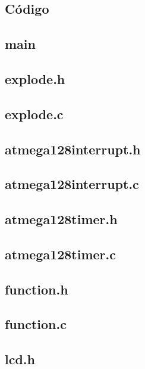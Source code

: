 \begin{appendices}
	\chapter{Código}
	{
	\small
	\section*{main}
	
	\newpage
	\section*{explode.h}
	
	\newpage
	\section*{explode.c}
	
	\newpage
	\section*{atmega128interrupt.h}
	
	\newpage
	\section*{atmega128interrupt.c}
	
	\newpage
	\section*{atmega128timer.h}
	
	\newpage
	\section*{atmega128timer.c}
	
	\newpage
	\section*{function.h}
	
	\newpage
	\section*{function.c}
	
	\newpage
	\section*{lcd.h}
	
	\newpage
}
\end{appendices}
